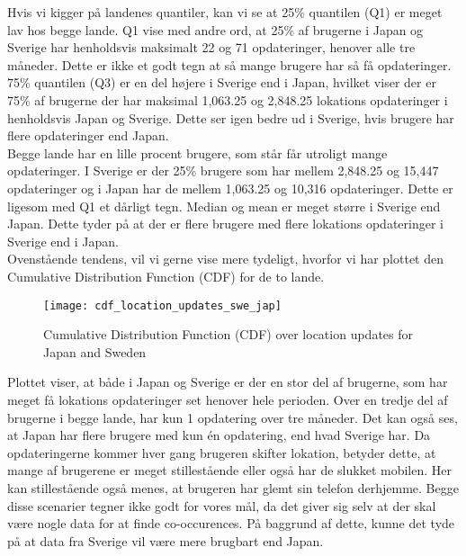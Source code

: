 Hvis vi kigger på landenes quantiler, kan vi se at 25\% quantilen (Q1) er meget lav hos begge lande. Q1 vise med andre ord, at 25\% af brugerne i Japan og Sverige har henholdsvis maksimalt 22 og 71 opdateringer, henover alle tre måneder. Dette er ikke et godt tegn at så mange brugere har så få opdateringer. 75\% quantilen (Q3) er en del højere i Sverige end i Japan, hvilket viser der er 75\% af brugerne der har maksimal 1,063.25 og 2,848.25 lokations opdateringer i henholdsvis Japan og Sverige. Dette ser igen bedre ud i Sverige, hvis brugere har flere opdateringer end Japan. \\ 

Begge lande har en lille procent brugere, som står får utroligt mange opdateringer. I Sverige er der 25\% brugere som har mellem 2,848.25 og 15,447 opdateringer og i Japan har de mellem 1,063.25 og 10,316 opdateringer. Dette er ligesom med Q1 et dårligt tegn. 
Median og mean er meget større i Sverige end Japan. Dette tyder på at der er flere brugere med flere lokations opdateringer i Sverige end i Japan. \\


Ovenstående tendens, vil vi gerne vise mere tydeligt, hvorfor vi har plottet den Cumulative Distribution Function (CDF) for de to lande. 
\begin{figure}[H]
    \hspace*{-1.0cm}
    \centering
    \texttt{[image: cdf\_location\_updates\_swe\_jap]}
    \caption{Cumulative Distribution Function (CDF) over location updates for Japan and Sweden}
    \label{fig:country_cdf}
\end{figure}

Plottet viser, at både i Japan og Sverige er der en stor del af brugerne, som har meget få lokations opdateringer set henover hele perioden. Over en tredje del af brugerne i begge lande, har kun 1 opdatering over tre måneder. Det kan også ses, at Japan har flere brugere med kun én opdatering, end hvad Sverige har. 
Da opdateringerne kommer hver gang brugeren skifter lokation, betyder dette, at mange af brugerene er meget stillestående eller også har de slukket mobilen. Her kan stillestående også menes, at brugeren har glemt sin telefon derhjemme.
Begge disse scenarier tegner ikke godt for vores mål, da det giver sig selv at der skal være nogle data for at finde co-occurences. 
På baggrund af dette, kunne det tyde på at data fra Sverige vil være mere brugbart end Japan. 








